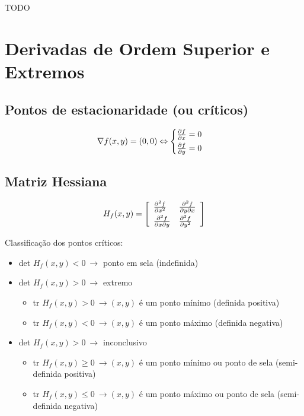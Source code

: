\documentclass[11pt, a4paper]{article}
\begin{document}
TODO

\section{Derivadas de Ordem Superior e Extremos}

\subsection{Pontos de estacionaridade (ou críticos)}

\begin{equation*}
    \nabla f(x, y) = (0, 0) \Leftrightarrow
    \begin{cases}
        \frac{\partial f}{\partial x} = 0 \vspace{2pt} \\
        \frac{\partial f}{\partial y} = 0
    \end{cases}
\end{equation*}

\subsection{Matriz Hessiana}

\begin{equation*}
    H_f(x, y) =
    \left[
    \begin{array}{l l}
        \frac{\partial^2 f}{\partial x^2}          &
        \frac{\partial^2 f}{\partial y \partial x} \vspace{2pt} \\
        \frac{\partial^2 f}{\partial x \partial y} &
        \frac{\partial^2 f}{\partial y^2}
    \end{array}
    \right]
\end{equation*}

Classificação dos pontos críticos:
\begin{itemize}
    \item det $H_f(x,y) < 0 \ \rightarrow$ ponto em sela (indefinida)
    \item det $H_f(x,y) > 0 \ \rightarrow$ extremo
          \begin{itemize}
              \item tr $H_f(x,y) > 0 \ \rightarrow (x,y)$ é um ponto mínimo (definida positiva)
              \item tr $H_f(x,y) < 0 \ \rightarrow (x,y)$ é um ponto máximo (definida negativa)
          \end{itemize}
    \item det $H_f(x,y) > 0 \ \rightarrow$ inconclusivo
          \begin{itemize}
              \item tr $H_f(x,y) \geq 0 \ \rightarrow (x,y)$ é um ponto mínimo ou ponto de sela (semi-definida positiva)
              \item tr $H_f(x,y) \leq 0 \ \rightarrow (x,y)$ é um ponto máximo ou ponto de sela (semi-definida negativa)
          \end{itemize}
\end{itemize}
\end{document}
